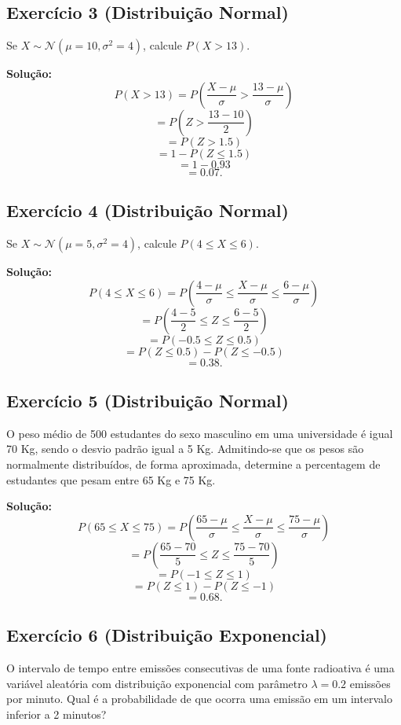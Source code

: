 \documentclass{article}
\begin{document}
\subsection{Exercício 3 (Distribuição Normal)}
Se $X \sim \mathcal{N}(\mu = 10, \sigma^2 = 4)$, calcule $P(X > 13)$.

\vspace{0.5cm}
\textbf{Solução:} 
    $$
    P(X > 13) = P\left(\frac{X - \mu}{\sigma} > \frac{13 - \mu}{\sigma}\right)
    $$
    $$
    = P\left(Z > \frac{13 - 10}{2}\right)
    $$
    $$
    = P(Z > 1.5)
    $$
    $$
    = 1 - P(Z \leq 1.5)
    $$
    $$
    = 1 - 0.93
    $$
    $$
    = 0.07.
    $$

\subsection{Exercício 4 (Distribuição Normal)}
Se $X \sim \mathcal{N}(\mu = 5, \sigma^2 = 4)$, calcule $P(4 \leq X \leq 6)$.

\vspace{0.5cm}
\textbf{Solução:} 
    $$
    P(4 \leq X \leq 6) = P\left(\frac{4 - \mu}{\sigma} \leq \frac{X - \mu}{\sigma} \leq \frac{6 - \mu}{\sigma}\right)
    $$
    $$
    = P\left(\frac{4 - 5}{2} \leq Z \leq \frac{6 - 5}{2}\right)
    $$
    $$
    = P(-0.5 \leq Z \leq 0.5)
    $$
    $$
    = P(Z \leq 0.5) - P(Z \leq -0.5)
    $$
    $$
    = 0.38.
    $$

\subsection{Exercício 5 (Distribuição Normal)}
O peso médio de 500 estudantes do sexo masculino em uma universidade é igual 70 Kg, sendo o desvio padrão igual a 5 Kg. Admitindo-se que os pesos são normalmente distribuídos, de forma aproximada, determine a percentagem de estudantes que pesam entre 65 Kg e 75 Kg.

\vspace{0.5cm}
\textbf{Solução:} 
    $$
    P(65 \leq X \leq 75) = P\left(\frac{65 - \mu}{\sigma} \leq \frac{X - \mu}{\sigma} \leq \frac{75 - \mu}{\sigma}\right)
    $$
    $$
    = P\left(\frac{65 - 70}{5} \leq Z \leq \frac{75 - 70}{5}\right)
    $$ 
    $$
    = P(-1 \leq Z \leq 1)
    $$
    $$
    = P(Z \leq 1) - P(Z \leq -1)
    $$
    $$
    = 0.68.
    $$

\subsection{Exercício 6 (Distribuição Exponencial)}
O intervalo de tempo entre emissões consecutivas de uma fonte radioativa é uma variável aleatória com distribuição exponencial com parâmetro $\lambda = 0.2$ emissões por minuto. Qual é a probabilidade de que ocorra uma emissão em um intervalo inferior a 2 minutos?
\end{document}
